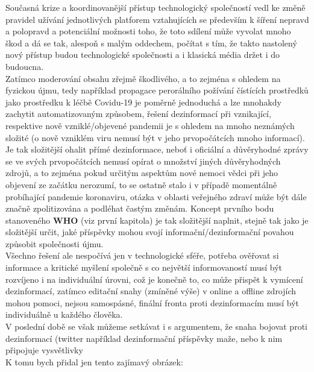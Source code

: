 Současná krize a koordinovanější přístup technologický společností vedl ke změně pravidel užívání jednotlivých platforem vztahujících se především k šíření nepravd a polopravd a potenciální možnosti toho, že toto sdílení může vyvolat mnoho škod a dá se tak, alespoň s malým oddechem, počítat s tím, že takto nastolený nový přístup budou technologické společnosti a i klasická média držet i do budoucna.\\


Zatímco moderování obsahu zřejmě škodlivého, a to zejména s ohledem na fyzickou újmu, tedy například propagace perorálního požívání čístících prostředků jako prostředku k léčbě Covidu-19 je poměrně jednoduchá a lze mnohakdy zachytit automatizovaným způsobem, řešení dezinformací při vznikající, respektive nově vzniklé/objevené pandemii je s ohledem na mnoho neznámých složité (o nově vzniklém viru nemusí být v jeho prvopočátcích mnoho informací). Je tak složitější ohalit přímé dezinformace, neboť i oficiální a důvěryhodné zprávy se ve svých prvopočátcích nemusí opírat o množství jiných důvěryhodných zdrojů, a to zejména pokud určitým aspektům nové nemoci vědci při jeho objevení ze začátku nerozumí, to se ostatně stalo i v případě momentálně probíhající pandemie koronaviru, otázka v oblasti veřejného zdraví může být dále značně zpolitizována a podléhat častým změnám. Koncept prvního bodu stanoveného \textbf{WHO} (viz první kapitola) je tak složitější naplnit, stejně tak jako je složitější určit, jaké příspěvky mohou svojí informační/dezinformační povahou způsobit společnosti újmu.\\

Všechno řešení ale nespočívá jen v technologické sféře, potřeba ověřovat si informace a kritické myšlení společně s co největší informovaností musí být rozvíjeno i na individuální úrovni, což je konečně to, co může přispět k vymícení dezinformací, zatímco editační snahy (zmíněné výše) v online a offline zdrojích mohou pomoci, nejsou samospásné, finální fronta proti dezinformacím musí být individuálně u každého člověka.\\

V poslední době se však můžeme setkávat i s argumentem, že snaha bojovat proti dezinformací (twitter například dezinformační příspěvky maže, nebo k nim připojuje vysvětlivky\\

K tomu bych přidal jen tento zajímavý obrázek:\\

